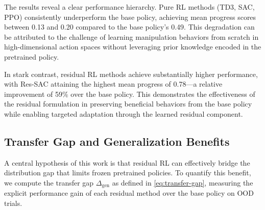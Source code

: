 
The results reveal a clear performance hierarchy. Pure \ac{RL} methods (TD3, SAC, PPO) consistently underperform the base policy, achieving mean progress scores between 0.13 and 0.20 compared to the base policy's 0.49. This degradation can be attributed to the challenge of learning manipulation behaviors from scratch in high-dimensional action spaces without leveraging prior knowledge encoded in the pretrained policy.

In stark contrast, residual \ac{RL} methods achieve substantially higher performance, with Res-SAC attaining the highest mean progress of 0.78---a relative improvement of 59\% over the base policy. This demonstrates the effectiveness of the residual formulation in preserving beneficial behaviors from the base policy while enabling targeted adaptation through the learned residual component.

\subsection{Transfer Gap and Generalization Benefits}
\label{sec:results:transfer}

A central hypothesis of this work is that residual \ac{RL} can effectively bridge the distribution gap that limits frozen pretrained policies. To quantify this benefit, we compute the transfer gap $\Delta_{\text{gen}}$ as defined in \autoref{eq:transfer-gap}, measuring the explicit performance gain of each residual method over the base policy on \ac{OOD} trials.

